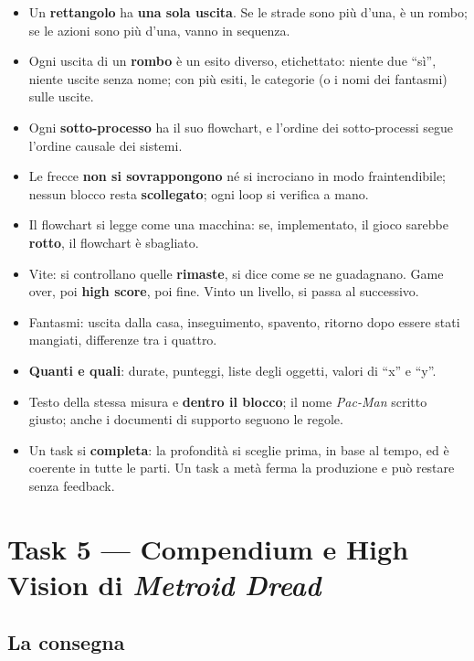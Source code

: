 \begin{itemize}
  \item Un \textbf{rettangolo} ha \textbf{una sola uscita}. Se le strade sono
        più d'una, è un rombo; se le azioni sono più d'una, vanno in sequenza.
  \item Ogni uscita di un \textbf{rombo} è un esito diverso, etichettato:
        niente due ``sì'', niente uscite senza nome; con più esiti, le
        categorie (o i nomi dei fantasmi) sulle uscite.
  \item Ogni \textbf{sotto-processo} ha il suo flowchart, e l'ordine dei
        sotto-processi segue l'ordine causale dei sistemi.
  \item Le frecce \textbf{non si sovrappongono} né si incrociano in modo
        fraintendibile; nessun blocco resta \textbf{scollegato}; ogni loop si
        verifica a mano.
  \item Il flowchart si legge come una macchina: se, implementato, il gioco
        sarebbe \textbf{rotto}, il flowchart è sbagliato.
  \item Vite: si controllano quelle \textbf{rimaste}, si dice come se ne
        guadagnano. Game over, poi \textbf{high score}, poi fine. Vinto un
        livello, si passa al successivo.
  \item Fantasmi: uscita dalla casa, inseguimento, spavento, ritorno dopo
        essere stati mangiati, differenze tra i quattro.
  \item \textbf{Quanti e quali}: durate, punteggi, liste degli oggetti, valori
        di ``x'' e ``y''.
  \item Testo della stessa misura e \textbf{dentro il blocco}; il nome
        \emph{Pac-Man} scritto giusto; anche i documenti di supporto seguono
        le regole.
  \item Un task si \textbf{completa}: la profondità si sceglie prima, in base
        al tempo, ed è coerente in tutte le parti. Un task a metà ferma la
        produzione e può restare senza feedback.
\end{itemize}

\section{Task 5 --- Compendium e High Vision di \emph{Metroid Dread}}
\label{rv:t5:sec:task}

\subsection{La consegna}

